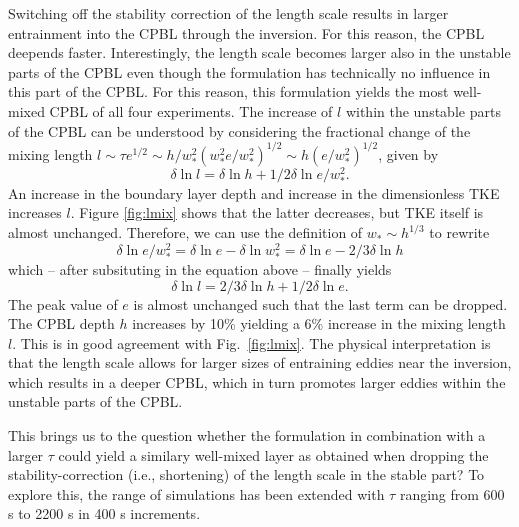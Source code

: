 \documentclass[dvipdfmx,a4paper,10pt]{article}
\begin{document}
Switching off the stability correction of the length scale results in larger entrainment into the CPBL through the inversion. For this reason, the CPBL deepends faster. Interestingly, the length scale becomes larger also in the unstable parts of the CPBL even though the formulation has technically no influence in this part of the CPBL. For this reason, this formulation yields the most well-mixed CPBL of all four experiments. The increase of $l$ within the unstable parts of the CPBL can be understood by considering the fractional change of the mixing length $l \sim \tau e^{1/2} \sim h/w_*^2 (w_*^2 e/w_*^2)^{1/2} \sim h (e/w_*^2)^{1/2}$, given by
\begin{equation}
 \delta \ln l = \delta \ln h + 1/2 \delta \ln e/w_*^2.
\end{equation}
An increase in the boundary layer depth and increase in the dimensionless TKE increases $l$. Figure \ref{fig:lmix} shows that the latter decreases, but TKE itself is almost unchanged. Therefore, we can use the definition of $w_*\sim h^{1/3}$ to rewrite
\begin{equation}
\delta \ln e/w_*^2 = \delta \ln e - \delta \ln w_*^2 = \delta \ln e - 2/3 \delta \ln h
\end{equation}
which -- after subsituting in the equation above -- finally yields
\begin{equation}
 \delta \ln l = 2/3 \delta \ln h + 1/2 \delta \ln e.
\end{equation}
The peak value of $e$ is almost unchanged such that the last term can be dropped. The CPBL depth $h$ increases by 10\% yielding a 6\% increase in the mixing length $l$. This is in good agreement with Fig.~\ref{fig:lmix}. The physical interpretation is that the \cite{teixeira04} length scale allows for larger sizes of entraining eddies near the inversion, which results in a deeper CPBL, which in turn promotes larger eddies within the unstable parts of the CPBL.   

This brings us to the question whether the \cite{suselj13} formulation in combination with a larger $\tau$ could yield a similary well-mixed layer as obtained when dropping the stability-correction (i.e., shortening) of the length scale in the stable part? To explore this, the range of simulations has been extended with $\tau$ ranging from 600 s to 2200 s in 400 s increments.
\end{document}
